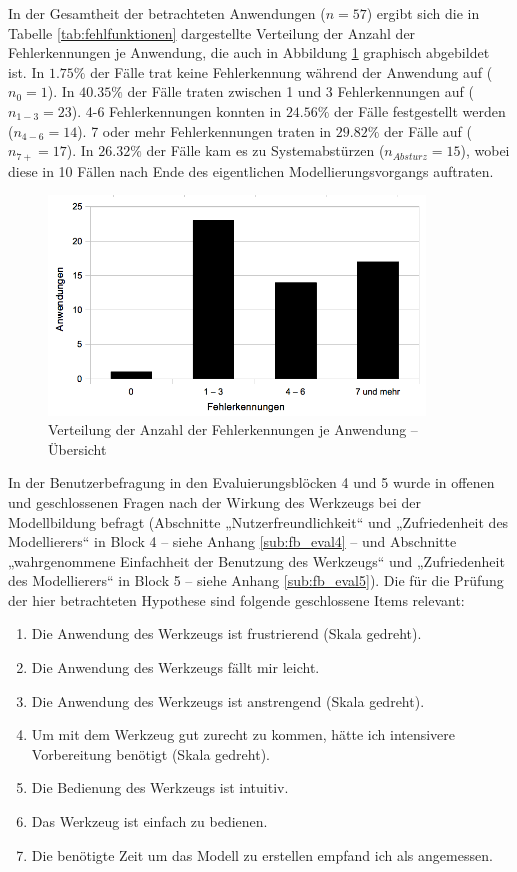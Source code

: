 In der Gesamtheit der betrachteten Anwendungen ($n=57$) ergibt sich die in Tabelle \ref{tab:fehlfunktionen} dargestellte Verteilung der Anzahl der Fehlerkennungen je Anwendung, die auch in Abbildung \ref{fig:img_Evaluierung_fehlerkennungen} graphisch abgebildet ist. In $1.75\%$ der Fälle trat keine Fehlerkennung während der Anwendung auf ($n_{0}=1$). In $40.35\%$ der Fälle traten zwischen 1 und 3 Fehlerkennungen auf ($n_{1-3}=23$). 4-6 Fehlerkennungen konnten in $24.56\%$ der Fälle festgestellt werden ($n_{4-6}=14$). 7 oder mehr Fehlerkennungen traten in $29.82\%$ der Fälle auf ($n_{7+}=17$). In $26.32\%$ der Fälle kam es zu Systemabstürzen ($n_{Absturz}=15$), wobei diese in 10 Fällen nach Ende des eigentlichen Modellierungsvorgangs auftraten.

\begin{figure}[htbp]
	\centering
		\includegraphics[width=10cm]{img/Evaluierung/fehlerkennungen.png}
	\caption{Verteilung der Anzahl der Fehlerkennungen je Anwendung -- Übersicht}
	\label{fig:img_Evaluierung_fehlerkennungen}
\end{figure}

In der Benutzerbefragung in den Evaluierungsblöcken 4 und 5 wurde in offenen und geschlossenen Fragen nach der Wirkung des Werkzeugs bei der Modellbildung befragt (Abschnitte „Nutzerfreundlichkeit“ und „Zufriedenheit des Modellierers“ in Block 4 -- siehe Anhang \ref{sub:fb_eval4} -- und Abschnitte „wahrgenommene Einfachheit der Benutzung des Werkzeugs“ und „Zufriedenheit des Modellierers“ in Block 5 -- siehe Anhang \ref{sub:fb_eval5}). Die für die Prüfung der hier betrachteten Hypothese sind folgende geschlossene Items relevant:

\begin{enumerate}
	\item Die Anwendung des Werkzeugs ist frustrierend (Skala gedreht).
	\item Die Anwendung des Werkzeugs fällt mir leicht.
	\item Die Anwendung des Werkzeugs ist anstrengend (Skala gedreht).
	\item Um mit dem Werkzeug gut zurecht zu kommen, hätte ich intensivere Vorbereitung benötigt (Skala gedreht).
	\item Die Bedienung des Werkzeugs ist intuitiv.
	\item Das Werkzeug ist einfach zu bedienen.
	\item Die benötigte Zeit um das Modell zu erstellen empfand ich als angemessen.
\end{enumerate}

